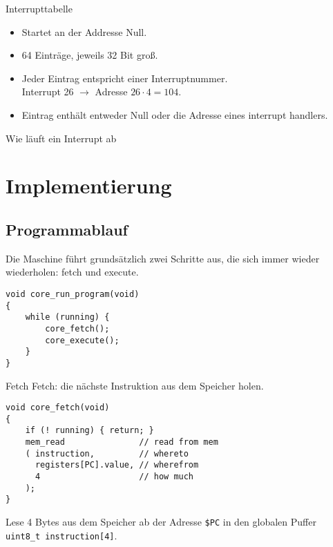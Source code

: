 \begin{frame}{Interrupttabelle}
 \begin{itemize}
   \item Startet an der Addresse Null.
   \item 64 Einträge, jeweils 32 Bit groß.
   \item Jeder Eintrag entspricht einer Interruptnummer.\\
         Interrupt 26 $\to$ Adresse $26 \cdot 4 = 104$.
   \item Eintrag enthält entweder Null oder die Adresse eines
         \glqq interrupt handlers\grqq.
 \end{itemize}
\end{frame}



\begin{frame}{Wie läuft ein Interrupt ab}
 \begin{center}
  
 \end{center}
\end{frame}



\section{Implementierung}

\subsection{Programmablauf}

\begin{frame}[fragile]{\insertsubsection}
 Die Maschine führt grundsätzlich zwei Schritte aus, die sich immer wieder
 wiederholen: fetch und execute. 
 \begin{lstlisting}
void core_run_program(void)
{
    while (running) {
        core_fetch();
        core_execute();
    }
}
 \end{lstlisting}
\end{frame}


\begin{frame}[fragile]{Fetch}
 Fetch: die nächste Instruktion aus dem Speicher holen.
\begin{lstlisting}
void core_fetch(void)
{
    if (! running) { return; }
    mem_read               // read from mem
    ( instruction,         // whereto
      registers[PC].value, // wherefrom
      4                    // how much
    );
}
\end{lstlisting}
Lese 4 Bytes aus dem Speicher ab der Adresse \texttt{\$PC} in den globalen
Puffer \texttt{uint8\_t instruction[4]}.
\end{frame}



